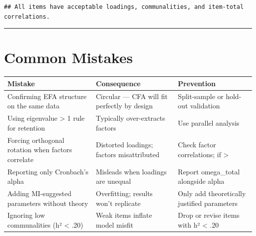 \documentclass[
]{article}
\newcounter{none} %
\begin{document}
\begin{verbatim}
## All items have acceptable loadings, communalities, and item-total correlations.
\end{verbatim}

\begin{center}\rule{0.5\linewidth}{0.5pt}\end{center}

\section{Common Mistakes}\label{common-mistakes}

{\def\LTcaptype{none} %
\begin{longtable}[]{@{}
  >{\raggedright\arraybackslash}p{}
  >{\raggedright\arraybackslash}p{}
  >{\raggedright\arraybackslash}p{}@{}}
\toprule\noalign{}
\begin{minipage}[b]{\linewidth}\raggedright
Mistake
\end{minipage} & \begin{minipage}[b]{\linewidth}\raggedright
Consequence
\end{minipage} & \begin{minipage}[b]{\linewidth}\raggedright
Prevention
\end{minipage} \\
\midrule\noalign{}
\endhead
\bottomrule\noalign{}
\endlastfoot
Confirming EFA structure on the same data & Circular --- CFA will fit
perfectly by design & Split-sample or hold-out validation \\
Using eigenvalue \textgreater{} 1 rule for retention & Typically
over-extracts factors & Use parallel analysis \\
Forcing orthogonal rotation when factors correlate & Distorted loadings;
factors misattributed & Check factor correlations; if \textgreater{} \\
Reporting only Cronbach's alpha & Misleads when loadings are unequal &
Report omega\_total alongside alpha \\
Adding MI-suggested parameters without theory & Overfitting; results
won't replicate & Only add theoretically justified parameters \\
Ignoring low communalities (h² \textless{} .20) & Weak items inflate
model misfit & Drop or revise items with h² \textless{} .20 \\
\end{longtable}
}
\end{document}
